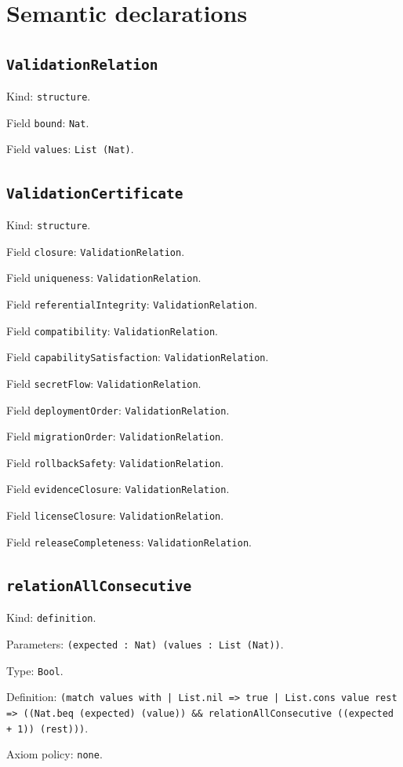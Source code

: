 \documentclass[11pt]{article}
\begin{document}
\section*{Semantic declarations}
\subsection*{\texttt{ValidationRelation}}
\noindent Kind: \texttt{structure}.\par
\noindent Field \texttt{bound}: \texttt{Nat}.\par
\noindent Field \texttt{values}: \texttt{List (Nat)}.\par
\subsection*{\texttt{ValidationCertificate}}
\noindent Kind: \texttt{structure}.\par
\noindent Field \texttt{closure}: \texttt{ValidationRelation}.\par
\noindent Field \texttt{uniqueness}: \texttt{ValidationRelation}.\par
\noindent Field \texttt{referentialIntegrity}: \texttt{ValidationRelation}.\par
\noindent Field \texttt{compatibility}: \texttt{ValidationRelation}.\par
\noindent Field \texttt{capabilitySatisfaction}: \texttt{ValidationRelation}.\par
\noindent Field \texttt{secretFlow}: \texttt{ValidationRelation}.\par
\noindent Field \texttt{deploymentOrder}: \texttt{ValidationRelation}.\par
\noindent Field \texttt{migrationOrder}: \texttt{ValidationRelation}.\par
\noindent Field \texttt{rollbackSafety}: \texttt{ValidationRelation}.\par
\noindent Field \texttt{evidenceClosure}: \texttt{ValidationRelation}.\par
\noindent Field \texttt{licenseClosure}: \texttt{ValidationRelation}.\par
\noindent Field \texttt{releaseCompleteness}: \texttt{ValidationRelation}.\par
\subsection*{\texttt{relationAllConsecutive}}
\noindent Kind: \texttt{definition}.\par
\noindent Parameters: \texttt{(expected : Nat) (values : List (Nat))}.\par
\noindent Type: \texttt{Bool}.\par
\noindent Definition: \texttt{(match values with | List.nil => true | List.cons value rest => ((Nat.beq (expected) (value)) \&\& relationAllConsecutive ((expected + 1)) (rest)))}.\par
\noindent Axiom policy: \texttt{none}.\par
\end{document}
